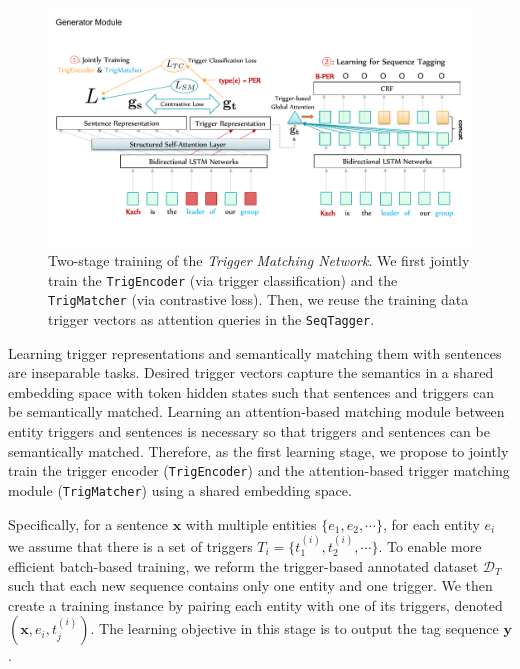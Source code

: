 \begin{figure}[h]  %
 	\centering 
	\includegraphics[width=0.85\linewidth]{LatexDiss/figures/tmn.pdf}
	\caption{Two-stage training of the \textit{Trigger Matching Network}. We first jointly train the {\texttt{TrigEncoder}} (via trigger classification) and the \texttt{TrigMatcher} (via contrastive loss). Then, we reuse the training data trigger vectors as attention queries in the \texttt{SeqTagger}.} 
	\label{fig:framework}
\end{figure}

Learning trigger representations and semantically matching them with sentences are inseparable tasks.
Desired trigger vectors capture the semantics in a shared embedding space with token hidden states such that sentences and triggers can be semantically matched.
Learning an attention-based matching module between entity triggers and sentences is necessary so that triggers and sentences can be semantically matched.
Therefore, as the first learning stage, we propose to jointly train the trigger encoder (\texttt{TrigEncoder}) and the attention-based trigger matching module (\texttt{TrigMatcher}) using a shared embedding space.

Specifically,
for a sentence $\mathbf{x}$ with multiple entities $\{e_1, e_2,\cdots\}$, for each entity $e_i$ we assume that there is a set of triggers $T_i=\{t^{(i)}_1, t^{(i)}_2, \cdots\}$.
To enable more efficient batch-based training, we reform the trigger-based annotated dataset $\mathcal{D}_{T}$ such that each new sequence contains only one entity and one trigger.
We then create a training instance by pairing each entity with one of its triggers, denoted $(\mathbf{x}, e_i, t^{(i)}_j)$.
The learning objective in this stage is to output the tag sequence $\mathbf{y}$. %


